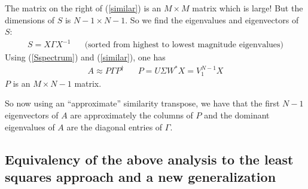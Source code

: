 \documentclass[]{article}
\begin{document}
The matrix on the right of (\ref{similar}) is an $M\times M$ matrix which
is large! But the dimensions of $S$ is $N-1\times N-1$.  So we find the
eigenvalues and eigenvectors of $S$:
\begin{eqnarray}
S=X\Gamma X^{-1}  \hspace{20pt}
\mbox{(sorted from highest to lowest magnitude eigenvalues)}
\label{Sspectrum}
\end{eqnarray}
Using (\ref{Sspectrum}) and (\ref{similar}), one has
\begin{eqnarray}
A \approx P\Gamma P^{\dagger} \hspace{20pt} P=U\Sigma W^{\ast}X=V_{1}^{N-1}X
\end{eqnarray}
$P$ is an $M\times N-1$ matrix.

So now using an ``approximate'' similarity transpose, we have that
the first $N-1$ eigenvectors of $A$ are approximately the columns of 
$P$ and the dominant eigenvalues of $A$ are the diagonal entries of
$\Gamma$.

\subsection{Equivalency of the above analysis to
  the least squares approach and a new generalization}
\end{document}
